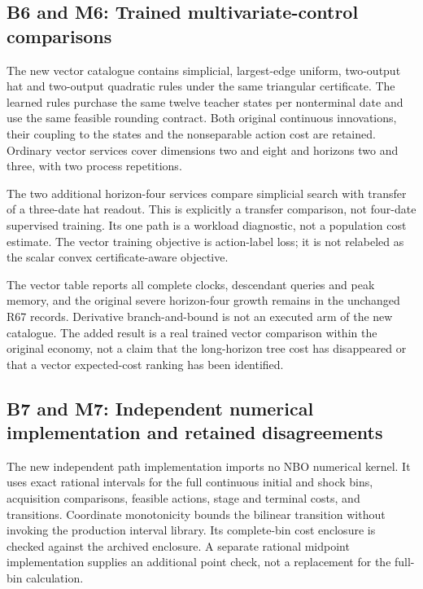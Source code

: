 \documentclass[ecta,nameyear,draft]{econsocart}
\begin{document}
\hypertarget{b6-and-m6-trained-multivariate-control-comparisons}{%
\subsection{B6 and M6: Trained multivariate-control
comparisons}\label{b6-and-m6-trained-multivariate-control-comparisons}}

The new vector catalogue contains simplicial, largest-edge uniform,
two-output hat and two-output quadratic rules under the same triangular
certificate. The learned rules purchase the same twelve teacher states
per nonterminal date and use the same feasible rounding contract. Both
original continuous innovations, their coupling to the states and the
nonseparable action cost are retained. Ordinary vector services cover
dimensions two and eight and horizons two and three, with two process
repetitions.

The two additional horizon-four services compare simplicial search with
transfer of a three-date hat readout. This is explicitly a transfer
comparison, not four-date supervised training. Its one path is a
workload diagnostic, not a population cost estimate. The vector training
objective is action-label loss; it is not relabeled as the scalar convex
certificate-aware objective.

The vector table reports all complete clocks, descendant queries and
peak memory, and the original severe horizon-four growth remains in the
unchanged R67 records. Derivative branch-and-bound is not an executed
arm of the new catalogue. The added result is a real trained vector
comparison within the original economy, not a claim that the
long-horizon tree cost has disappeared or that a vector expected-cost
ranking has been identified.

\hypertarget{b7-and-m7-independent-numerical-implementation-and-retained-disagreements}{%
\subsection{B7 and M7: Independent numerical implementation and retained
disagreements}\label{b7-and-m7-independent-numerical-implementation-and-retained-disagreements}}

The new independent path implementation imports no NBO numerical kernel.
It uses exact rational intervals for the full continuous initial and
shock bins, acquisition comparisons, feasible actions, stage and
terminal costs, and transitions. Coordinate monotonicity bounds the
bilinear transition without invoking the production interval library.
Its complete-bin cost enclosure is checked against the archived
enclosure. A separate rational midpoint implementation supplies an
additional point check, not a replacement for the full-bin calculation.
\end{document}
